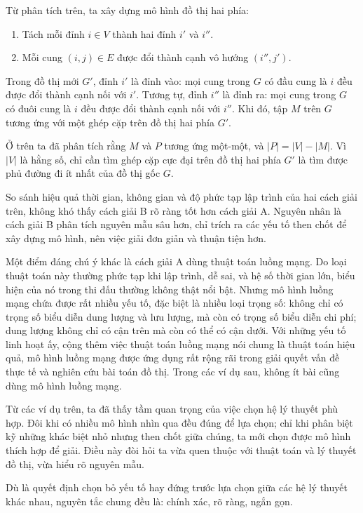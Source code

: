 \documentclass[11pt]{article}
\begin{document}
Từ phân tích trên, ta xây dựng mô hình đồ thị hai phía:
\begin{enumerate}
  \item Tách mỗi đỉnh \(i\in V\) thành hai đỉnh \(i'\) và \(i''\).
  \item Mỗi cung \((i,j)\in E\) được đổi thành cạnh vô hướng \((i'',j')\).
\end{enumerate}
Trong đồ thị mới \(G'\), đỉnh \(i'\) là đỉnh vào: mọi cung trong \(G\) có đầu
cung là \(i\) đều được đổi thành cạnh nối với \(i'\). Tương tự, đỉnh \(i''\)
là đỉnh ra: mọi cung trong \(G\) có đuôi cung là \(i\) đều được đổi thành
cạnh nối với \(i''\). Khi đó, tập \(M\) trên \(G\) tương ứng với một ghép cặp
trên đồ thị hai phía \(G'\).

Ở trên ta đã phân tích rằng \(M\) và \(P\) tương ứng một-một, và
\(|P|=|V|-|M|\). Vì \(|V|\) là hằng số, chỉ cần tìm ghép cặp cực đại trên đồ
thị hai phía \(G'\) là tìm được phủ đường đi ít nhất của đồ thị gốc \(G\).

So sánh hiệu quả thời gian, không gian và độ phức tạp lập trình của hai cách
giải trên, không khó thấy cách giải B rõ ràng tốt hơn cách giải A. Nguyên
nhân là cách giải B phân tích nguyên mẫu sâu hơn, chỉ trích ra các yếu tố
then chốt để xây dựng mô hình, nên việc giải đơn giản và thuận tiện hơn.

Một điểm đáng chú ý khác là cách giải A dùng thuật toán luồng mạng. Do loại
thuật toán này thường phức tạp khi lập trình, dễ sai, và hệ số thời gian lớn,
biểu hiện của nó trong thi đấu thường không thật nổi bật. Nhưng mô hình luồng
mạng chứa được rất nhiều yếu tố, đặc biệt là nhiều loại trọng số: không chỉ
có trọng số biểu diễn dung lượng và lưu lượng, mà còn có trọng số biểu diễn
chi phí; dung lượng không chỉ có cận trên mà còn có thể có cận dưới. Với
những yếu tố linh hoạt ấy, cộng thêm việc thuật toán luồng mạng nói chung là
thuật toán hiệu quả, mô hình luồng mạng được ứng dụng rất rộng rãi trong giải
quyết vấn đề thực tế và nghiên cứu bài toán đồ thị. Trong các ví dụ sau,
không ít bài cũng dùng mô hình luồng mạng.

Từ các ví dụ trên, ta đã thấy tầm quan trọng của việc chọn hệ lý thuyết phù
hợp. Đôi khi có nhiều mô hình nhìn qua đều đúng để lựa chọn; chỉ khi phân
biệt kỹ những khác biệt nhỏ nhưng then chốt giữa chúng, ta mới chọn được mô
hình thích hợp để giải. Điều này đòi hỏi ta vừa quen thuộc với thuật toán và
lý thuyết đồ thị, vừa hiểu rõ nguyên mẫu.

Dù là quyết định chọn bỏ yếu tố hay đứng trước lựa chọn giữa các hệ lý thuyết
khác nhau, nguyên tắc chung đều là: chính xác, rõ ràng, ngắn gọn.
\end{document}
